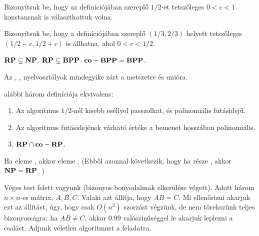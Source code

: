 \begin{Exercise}[counter={sorszam}, difficulty=0]
Bizonyítsuk be, hogy az \RP definíciójában szereplő $1/2$-et tetszőleges
$0<c<1$ konstansnak is választhattuk volna.
\end{Exercise}


\begin{Exercise}[counter={sorszam}, difficulty=0]
Bizonyítsuk be, hogy a \BPP definíciójában szereplő $(1/3,2/3)$ helyett
tetszőleges $(1/2-c,1/2+c)$ is állhatna, ahol $0<c<1/2$.
\end{Exercise}


\begin{Exercise}[counter={sorszam}, difficulty=-1]
$\mbox{\ensuremath{\mathbf{RP}}} \subseteq \mbox{\ensuremath{\mathbf{NP}}}$. $\mbox{\ensuremath{\mathbf{RP}}} \subseteq \mbox{\ensuremath{\mathbf{BPP}}}$. $\mbox{\ensuremath{\mathbf{co-BPP}}} = \mbox{\ensuremath{\mathbf{BPP}}}$.
\end{Exercise}


\begin{Exercise}[counter={sorszam}, difficulty=0]
Az \RP, \BPP, \ZPP nyelvosztályok mindegyike zárt a metszetre és unióra.
\end{Exercise}


\begin{Exercise}[counter={sorszam}, difficulty=0]
\ZPP alábbi három definíciója ekvivalens:
\begin{enumerate}
 \item Az algoritmus $1/2$-nél kisebb eséllyel passzolhat, és polinomiális futásidejű.
 \item Az algoritmus futásidejének várható értéke a bemenet hosszában polinomiális.
 \item $\mbox{\ensuremath{\mathbf{RP}}} \cap \mbox{\ensuremath{\mathbf{co-RP}}}$.
\end{enumerate}
\end{Exercise}


\begin{Exercise}[counter={sorszam}, difficulty=0]
Ha \SAT eleme \BPP, akkor \SAT eleme \RP. (Ebből azonnal
következik, hogy ha \NP része \BPP, akkor $\mbox{\ensuremath{\mathbf{NP}}}=\mbox{\ensuremath{\mathbf{RP}}}$. )
\end{Exercise}


\begin{Exercise}[counter={sorszam}, difficulty=-1]
Véges test felett vagyunk (bizonyos bonyodalmak elkerülése
végett). Adott három $n \times n$-es mátrix, $A,B,C$. Valaki azt állítja, hogy $AB=C$. Mi
ellenőrizni akarjuk ezt az állítást, úgy, hogy csak $O(n^2)$ szorzást végzünk,
de nem törekszünk teljes bizonyosságra: ha $AB \neq C$, akkor
$0.99$ valószínűséggel le akarjuk leplezni a csalást. Adjunk véletlen algoritmust
a feladatra.
\end{Exercise}


